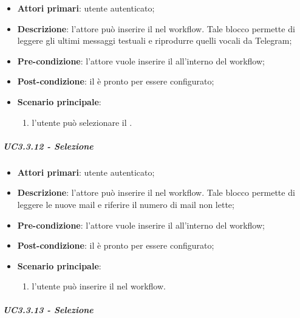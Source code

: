 \begin{itemize}
\item \textbf{Attori primari}: utente autenticato;

\item \textbf{Descrizione}: l'attore può inserire il \BTelegram{} nel workflow. Tale blocco permette di leggere gli ultimi messaggi testuali e riprodurre quelli vocali da Telegram;

\item \textbf{Pre-condizione}: l'attore vuole inserire il \BTelegram{} all'interno del workflow;

\item \textbf{Post-condizione}:  il \BTelegram{} è pronto per essere configurato;

\item \textbf{Scenario principale}:
\begin{enumerate}
\item l'utente può selezionare il \BTelegram{}.

\end{enumerate}
\end{itemize}

\subparagraph{UC3.3.12 - Selezione \BMail{}}

\begin{itemize}
\item \textbf{Attori primari}: utente autenticato;

\item \textbf{Descrizione}: l'attore può inserire il \BMail{} nel workflow. Tale blocco permette di leggere le nuove mail e riferire il numero di mail non lette;

\item \textbf{Pre-condizione}: l'attore vuole inserire il \BMail{} all'interno del workflow;

\item \textbf{Post-condizione}: il \BMail{} è pronto per essere configurato;

\item \textbf{Scenario principale}:
\begin{enumerate}
\item l'utente può inserire il \BMail{} nel workflow.

\end{enumerate}
\end{itemize}

\subparagraph{UC3.3.13 - Selezione \BCalendario{}}

